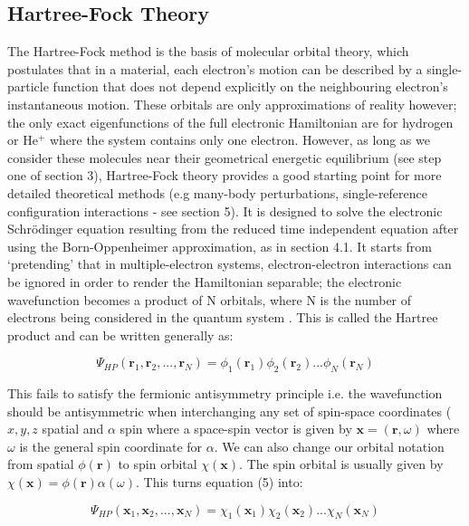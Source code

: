 \documentclass[10pt]{article}
\begin{document}
\subsection{Hartree-Fock Theory}
The Hartree-Fock method is the basis of molecular orbital theory, which postulates that in a material, each electron's motion can be described by a single-particle function that does not depend explicitly on the neighbouring electron's instantaneous motion. These orbitals are only approximations of reality however; the only exact eigenfunctions of the full electronic Hamiltonian are for hydrogen or He$^+$ where the system contains only one electron. However, as long as we consider these molecules near their geometrical energetic equilibrium (see step one of section 3), Hartree-Fock theory provides a good starting point for more detailed theoretical methods (e.g many-body perturbations, single-reference configuration interactions - see section 5). It is designed to solve the electronic Schrödinger equation resulting from the reduced time independent equation after using the Born-Oppenheimer approximation, as in section 4.1. It starts from `pretending' that in multiple-electron systems, electron-electron interactions can be ignored in order to render the Hamiltonian separable; the electronic wavefunction becomes a product of N orbitals, where N is the number of electrons being considered in the quantum system \cite{sherrill2000introduction}. This is called the Hartree product and can be written generally as:

\begin{equation}
	\Psi_{HP}(\mathbf{r}_1,\mathbf{r}_2,...,\mathbf{r}_N) = \phi_1(\mathbf{r}_1)\phi_2(\mathbf{r}_2)...\phi_N(\mathbf{r}_N)
\end{equation}

This fails to satisfy the fermionic antisymmetry principle i.e. the wavefunction should be antisymmetric when interchanging any set of spin-space coordinates ($x,y,z$ spatial and $\alpha$ spin where a space-spin vector is given by $\mathbf{x}=(\mathbf{r},\omega)$ where $\omega$ is the general spin coordinate for $\alpha$. We can also change our orbital notation from spatial $\phi(\mathbf{r})$ to spin orbital $\chi(\mathbf{x})$. The spin orbital is usually given by $\chi(\mathbf{x}) = \phi(\mathbf{r})\alpha(\omega)$. This turns equation (5) into:

\begin{equation*}
	\Psi_{HP}(\mathbf{x}_1,\mathbf{x}_2,...,\mathbf{x}_N) = \chi_1(\mathbf{x}_1)\chi_2(\mathbf{x}_2)...\chi_N(\mathbf{x}_N)
\end{equation*}
\end{document}
